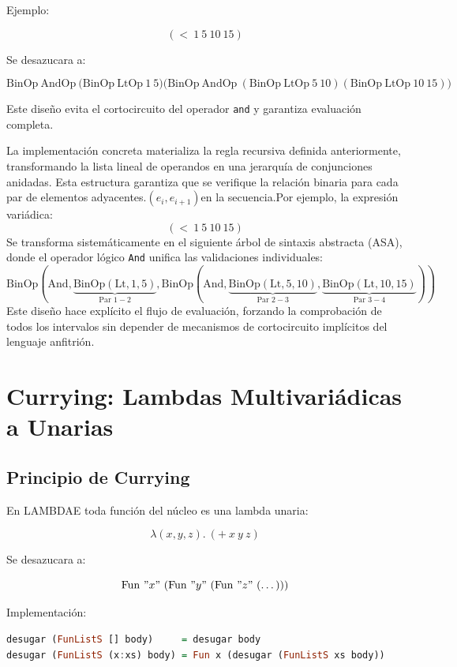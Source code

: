 \documentclass[a4paper,12pt]{article}
\begin{document}
\begin{tcolorbox}[title= Corrección: Desugar modulo A4, breakable]
Ejemplo:

\[
(<\ 1\ 5\ 10\ 15)
\]

Se desazucara a:

\[
\mathrm{BinOp}\ \mathrm{AndOp}\ 
  \bigl(\mathrm{BinOp}\ \mathrm{LtOp}\ 1\ 5 \bigr)
  \bigl(\mathrm{BinOp}\ \mathrm{AndOp}\ 
      (\mathrm{BinOp}\ \mathrm{LtOp}\ 5\ 10)
      (\mathrm{BinOp}\ \mathrm{LtOp}\ 10\ 15)
  \bigr)
\]

Este diseño evita el cortocircuito del operador \texttt{and} y garantiza evaluación completa.

\textbf{} La implementación concreta materializa la regla recursiva definida anteriormente, transformando la lista lineal de operandos en una jerarquía de conjunciones anidadas. Esta estructura garantiza que se verifique la relación binaria para cada par de elementos adyacentes.$(e_i, e_{i+1})$en la secuencia.Por ejemplo, la expresión variádica:$$(<\ 1\ 5\ 10\ 15)$$Se transforma sistemáticamente en el siguiente árbol de sintaxis abstracta (ASA), donde el operador lógico \texttt{And} unifica las validaciones individuales:$$\mathrm{BinOp}(\mathrm{And},
  \underbrace{\mathrm{BinOp}(\mathrm{Lt}, 1, 5)}_{\text{Par } 1-2},
  \mathrm{BinOp}(\mathrm{And},
    \underbrace{\mathrm{BinOp}(\mathrm{Lt}, 5, 10)}_{\text{Par } 2-3},
    \underbrace{\mathrm{BinOp}(\mathrm{Lt}, 10, 15)}_{\text{Par } 3-4}
  )
)$$Este diseño hace explícito el flujo de evaluación, forzando la comprobación de todos los intervalos sin depender de mecanismos de cortocircuito implícitos del lenguaje anfitrión.

\section{Currying: Lambdas Multivariádicas a Unarias}

\subsection{Principio de Currying}

En LAMBDAE toda función del núcleo es una lambda unaria:

\[
\lambda(x,y,z).\ (+\ x\ y\ z)
\]

Se desazucara a:

\[
\mathrm{Fun}\ "x"\ (\mathrm{Fun}\ "y"\ (\mathrm{Fun}\ "z"\ (\dots )))
\]

Implementación:

\begin{lstlisting}[language=Haskell]
desugar (FunListS [] body)     = desugar body
desugar (FunListS (x:xs) body) = Fun x (desugar (FunListS xs body))
\end{lstlisting}




\end{tcolorbox}
\end{document}
